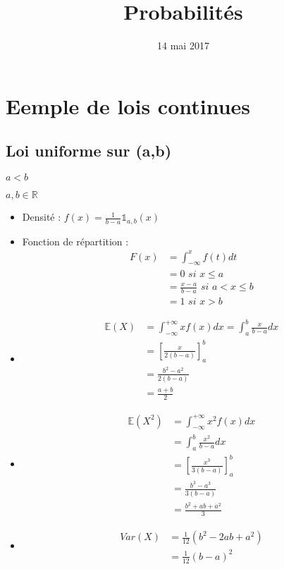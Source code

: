 \documentclass{article}
\title{Probabilités}
\date{14 mai 2017}
\begin{document}
\maketitle

\section{Eemple de lois continues}

\subsection{Loi uniforme sur (a,b)}

$a < b$


$a, b \in \mathbb{R}$

\begin{itemize}
  \item Densité : $f(x) = \frac{1}{b-a} \mathbb{1}_{a,b}(x)$
\item Fonction de répartition :
\begin{align*}
  F(x) &= \int_{- \infty}^{x} f(t)dt \\
  &= 0 \textit{ si } x \leq a \\
  &= \frac{x-a}{b-a} \textit{ si } a < x \leq b \\
  &= 1 \textit{ si } x > b
\end{align*}
\item
\begin{align*}
  \mathbb{E}(X) &= \int_{- \infty}^{+ \infty}xf(x)dx = \int_{a}^{b} \frac{x}{b-a}dx \\
  &= [ \frac{x}{2(b-a)}]_{a}^b \\
  &= \frac{b^2 - a^2}{2(b-a)} \\
  &= \frac{a+b}{2}
\end{align*}
\item
\begin{align*}
  \mathbb{E}(X^2) &= \int_{- \infty}^{+ \infty}x^2f(x)dx \\
  &= \int_{a}^{b} \frac{x^2}{b-a} dx\\
  &= [ \frac{x^3}{3(b-a)}]_{a}^b \\
  &= \frac{b^3-a^3}{3(b-a)} \\
  &= \frac{b^2+ab+a^2}{3}
\end{align*}
\item
\begin{align*}
  \textit{Var}(X) &= \frac{1}{12}(b^2-2ab+a^2) \\
  &= \frac{1}{12}(b-a)^2
\end{align*}
\end{itemize}
\end{document}
